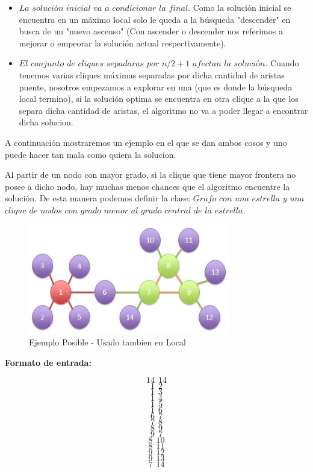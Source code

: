 \begin{itemize}
 
  \item $La$ $solución$ $inicial$ $va$ $a$ $condicionar$ $la$ $final$. Como la solución inicial se encuentra en un máximo local solo le queda a la búsqueda "descender" en busca de un "nuevo ascenso" (Con ascender o descender nos referimos a mejorar o empeorar la solución actual respectivamente).


  \item $El$ $conjunto$ $de$ $cliques$ $sepadaras$ $por$ $n/2+1$ $afectan$ $la$ $solución$. Cuando tenemos varias cliques máximas separadas por dicha cantidad de aristas puente, nosotros empezamos a explorar en una (que es donde la búsqueda local termino), si la solución optima se encuentra en otra clique a la que los separa dicha cantidad de aristas, el algoritmo no va a poder llegar a encontrar dicha solucion. 

\end{itemize}

A continuación mostraremos un ejemplo en el que se dan ambos cosos y uno puede hacer tan mala como quiera la solucion.

 Al partir de un nodo con mayor grado, si la clique que tiene mayor frontera no posee a dicho nodo, hay muchas menos chances que el algoritmo encuentre la solución. De esta manera podemos definir la clase:
 $Grafo$ $con$ $una$ $estrella$ $y$ $una$ $clique$ $de$ $nodos$ $con$ $grado$ $menor$ $al$ $grado$ $central$ $de$ $la$ $estrella.$ 

\begin{figure}[H] %
\begin{center}
\includegraphics[width=250pt]{../imgs/ej1local.jpg}
\caption{Ejemplo Posible - Usado tambien en Local}
\end{center}
\end{figure}

\textbf{Formato de entrada:}

$$14\ \  14$$
$$1\ \  2$$
$$1\ \  3$$
$$1\ \  4$$
$$1\ \  5$$
$$1\ \  6$$
$$6\ \  7$$
$$7 \ \ 8$$
$$8\ \  9$$
$$9\ \  7$$
$$8\ \  10$$
$$8\ \  11$$
$$9\ \  12$$
$$9\ \  13$$
$$7\ \  14$$


